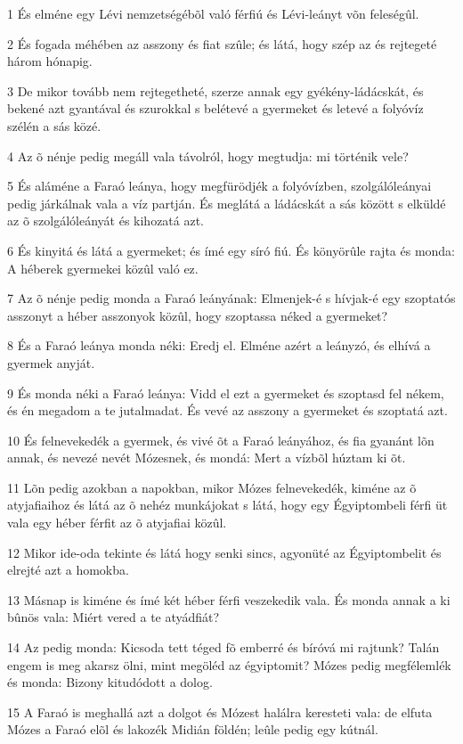 \par 1 És elméne egy Lévi nemzetségébõl való férfiú és Lévi-leányt võn feleségûl.
\par 2 És fogada méhében az asszony és fiat szûle; és látá, hogy szép az és rejtegeté három hónapig.
\par 3 De mikor tovább nem rejtegetheté, szerze annak egy gyékény-ládácskát, és bekené azt gyantával és szurokkal s belétevé a gyermeket és letevé a folyóvíz szélén a sás közé.
\par 4 Az õ nénje pedig megáll vala távolról, hogy megtudja: mi történik vele?
\par 5 És aláméne a Faraó leánya, hogy megfürödjék a folyóvízben, szolgálóleányai pedig járkálnak vala a víz partján. És meglátá a ládácskát a sás között s elküldé az õ szolgálóleányát és kihozatá azt.
\par 6 És kinyitá és látá a gyermeket; és ímé egy síró fiú. És könyörûle rajta és monda: A héberek gyermekei közûl való ez.
\par 7 Az õ nénje pedig monda a Faraó leányának: Elmenjek-é s hívjak-é egy szoptatós asszonyt a héber asszonyok közûl, hogy szoptassa néked a gyermeket?
\par 8 És a Faraó leánya monda néki: Eredj el. Elméne azért a leányzó, és elhívá a gyermek anyját.
\par 9 És monda néki a Faraó leánya: Vidd el ezt a gyermeket és szoptasd fel nékem, és én megadom a te jutalmadat. És vevé az asszony a gyermeket és szoptatá azt.
\par 10 És felnevekedék a gyermek, és vivé õt a Faraó leányához, és fia gyanánt lõn annak, és nevezé nevét Mózesnek, és mondá: Mert a vízbõl húztam ki õt.
\par 11 Lõn pedig azokban a napokban, mikor Mózes felnevekedék, kiméne az õ atyjafiaihoz és látá az õ nehéz munkájokat s látá, hogy egy Égyiptombeli férfi üt vala egy héber férfit az õ atyjafiai közûl.
\par 12 Mikor ide-oda tekinte és látá hogy senki sincs, agyonüté az Égyiptombelit és elrejté azt a homokba.
\par 13 Másnap is kiméne és ímé két héber férfi veszekedik vala. És monda annak a ki bûnös vala: Miért vered a te atyádfiát?
\par 14 Az pedig monda: Kicsoda tett téged fõ emberré és bíróvá mi rajtunk? Talán engem is meg akarsz ölni, mint megöléd az égyiptomit? Mózes pedig megfélemlék és monda: Bizony kitudódott a dolog.
\par 15 A Faraó is meghallá azt a dolgot és Mózest halálra keresteti vala: de elfuta Mózes a Faraó elõl és lakozék Midián földén; leûle pedig egy kútnál.
